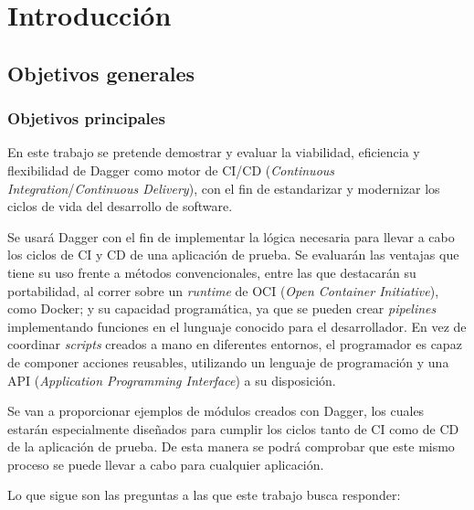 \chapter{Introducción}


\section{Objetivos generales}


\subsection*{Objetivos principales}

En este trabajo se pretende demostrar y evaluar la viabilidad, eficiencia y flexibilidad de Dagger\cite{dagger} como motor de CI/CD (\textit{Continuous Integration}/\textit{Continuous Delivery})\cite{ci,cd}, con el fin de estandarizar y modernizar los ciclos de vida del desarrollo de software.

Se usará Dagger con el fin de implementar la lógica necesaria para llevar a cabo los ciclos de CI y CD de una aplicación de prueba. Se evaluarán las ventajas que tiene su uso frente a métodos convencionales, entre las que destacarán su portabilidad, al correr sobre un \textit{runtime} de OCI (\textit{Open Container Initiative}\cite{oci}), como Docker\cite{docker}; y su capacidad programática, ya que se pueden crear \textit{pipelines} implementando funciones en el lunguaje conocido para el desarrollador. En vez de coordinar \textit{scripts} creados a mano en diferentes entornos, el programador es capaz de componer acciones reusables, utilizando un lenguaje de programación y una API (\textit{Application Programming Interface}) a su disposición.

Se van a proporcionar ejemplos de módulos creados con Dagger, los cuales estarán especialmente diseñados para cumplir los ciclos tanto de CI como de CD de la aplicación de prueba. De esta manera se podrá comprobar que este mismo proceso se puede llevar a cabo para cualquier aplicación.

Lo que sigue son las preguntas a las que este trabajo busca responder:

